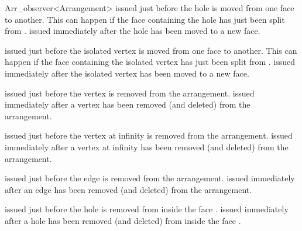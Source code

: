 \begin{ccRefClass}{Arr_observer<Arrangement>}
    {issued just before the hole  is moved from one face to another.
     This can happen if the face  containing the hole has just
     been split from .}
\ccGlue
{}
    {issued immediately after the hole  has been moved to a new face.}

    {issued just before the isolated vertex  is moved from one face
     to another.
     This can happen if the face  containing the isolated vertex
     has just been split from .}
\ccGlue
{}
    {issued immediately after the isolated vertex  has been moved to a 
     new face.}

    {issued just before the vertex  is removed from the arrangement.}
\ccGlue
{}
    {issued immediately after a vertex has been removed (and deleted)
     from the arrangement.}

    {issued just before the vertex at infinity  is removed from the
     arrangement.}
\ccGlue
{}
    {issued immediately after a vertex at infinity has been removed
     (and deleted) from the arrangement.}

    {issued just before the edge  is removed from the arrangement.}
\ccGlue
{}
    {issued immediately after an edge has been removed (and deleted)
     from the arrangement.}

    {issued just before the hole  is removed from inside the
     face .}
\ccGlue
{}
    {issued immediately after a hole has been removed (and deleted)
     from inside the face .}

\end{ccRefClass}

\ccRefPageEnd
